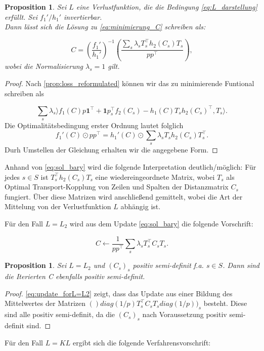 \documentclass[11pt,a4paper]{article}
\newtheorem{proposition}[theorem]{Proposition}
\numberwithin{equation}{section}
\begin{document}
	
	\begin{proposition}
		Sei $L$ eine Verlustfunktion, die die Bedingung \autoref{eq:L_darstellung} erfüllt. Sei $f_1'/h_1'$ invertierbar. \\
		Dann lässt sich die Lösung zu \autoref{eq:minimierung_C} schreiben als:
		
		\begin{equation}
		C = \left(\frac{f_1'}{h_1'}\right)^{-1} \left(\frac{\sum_s{\lambda_s T_s^\top h_2(C_s)T_s}}{pp^\top}\right),
		\label{eq:sol_bary}
		\end{equation}
		wobei die Normalisierung $\lambda_s = 1$ gilt.
	\end{proposition}
	\begin{proof}
		Nach \autoref{prop:loss_reformulated} können wir das zu minimierende Funtional schreiben als
		
		\begin{equation}
		\sum_s{\lambda_s \rangle f_1(C)p\boldsymbol{1}^\top + \boldsymbol{1}p_s^\top f_2(C_s) - h_1(C)T_s h_2(C_s)^\top , T_s \rangle}.
		\end{equation}
		Die Optimalitätsbedingung erster Ordnung lautet folglich 
		\begin{equation}
		f_1'(C) \odot pp^\top = h_1'(C) \odot \sum_s{\lambda_s T_sh_2(C_s)T_s^\top}.
		\end{equation}
		Durh Umstellen der Gleichung erhalten wir die angegebene Form.
	\end{proof}
	Anhand von \autoref{eq:sol_bary} wird die folgende Interpretation deutlich/möglich: Für jedes $s \in S$ ist $T_s^\top h_2(C_s)T_s$ eine wiedereingeordnete Matrix, wobei $T_s$ als Optimal Transport-Kopplung von Zeilen und Spalten der Distanzmatrix $C_s$ fungiert. Über diese Matrizen wird anschließend gemittelt, wobei die Art der Mittelung von der Verlustfunktion $L$ abhängig ist.
	
	Für den Fall $L=L_2$ wird aus dem Update \autoref{eq:sol_bary} die folgende Vorschrift:
	
	\begin{equation}
	C \leftarrow \frac{1}{pp^\top}\sum_s{\lambda_s T_s^\top C_s T_s}. \label{eq:update_forL=L2}
	\end{equation}
	
	\begin{proposition}
		Sei $L=L_2$ und $(C_s)_s$ positiv semi-definit f.a. $s \in S$. Dann sind die Iterierten C ebenfalls positiv semi-definit. 
	\end{proposition}
	\begin{proof}
		\autoref{eq:update_forL=L2} zeigt, dass das Update aus einer Bildung des Mittelwertes der Matrizen $()diag(1/p)T_s^\top C_s T_s diag(1/p))_s$ besteht. Diese sind alle positiv semi-definit, da die $(C_s)_s$ nach Voraussetzung positiv semi-definit sind.
	\end{proof}
	Für den Fall $L = KL$ ergibt sich die folgende Verfahrensvorschrift:
	
\end{document}
